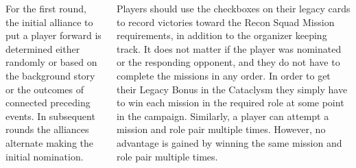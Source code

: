 \begin{columns}
For the first round, the initial alliance to put a player forward is
determined either randomly or based on the background story or the
outcomes of connected preceding events.  In subsequent rounds the
alliances alternate making the initial nomination.

Players should use the checkboxes on their legacy cards to record
victories toward the Recon Squad Mission requirements, in addition to
the organizer keeping track.  It does not matter if the player was
nominated or the responding opponent, and they do not have to complete
the missions in any order.  In order to get their Legacy Bonus in the
Cataclysm they simply have to win each mission in the required role at
some point in the campaign.  Similarly, a player can attempt a mission
and role pair multiple times.  However, no advantage is gained by
winning the same mission and role pair multiple times.



\end{columns}
